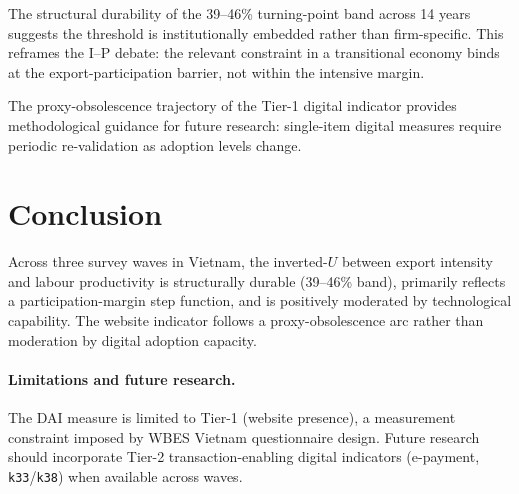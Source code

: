 \documentclass[12pt,a4paper]{article}
\begin{document}
The structural durability of the 39--46\% turning-point band across 14 years
suggests the threshold is institutionally embedded rather than firm-specific.
This reframes the I--P debate: the relevant constraint in a transitional
economy binds at the export-participation barrier, not within the intensive
margin.

The proxy-obsolescence trajectory of the Tier-1 digital indicator provides
methodological guidance for future research: single-item digital measures
require periodic re-validation as adoption levels change.

\section{Conclusion}
\label{sec:conclusion}

Across three survey waves in Vietnam, the inverted-\(U\) between export
intensity and labour productivity is structurally durable (39--46\% band),
primarily reflects a participation-margin step function, and is positively
moderated by technological capability.  The website indicator follows a
proxy-obsolescence arc rather than moderation by digital adoption capacity.

\paragraph{Limitations and future research.}
The DAI measure is limited to Tier-1 (website presence), a measurement
constraint imposed by WBES Vietnam questionnaire design.  Future research
should incorporate Tier-2 transaction-enabling digital indicators
(e-payment, \texttt{k33}/\texttt{k38}) when available across waves.

\printbibliography
\end{document}
